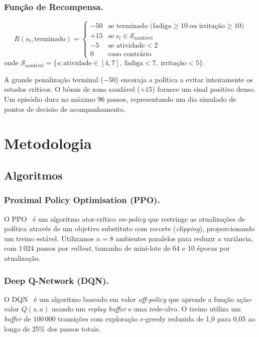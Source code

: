 \documentclass[runningheads]{llncs}
\begin{document}
\subsubsection{Função de Recompensa.}
\begin{equation}
  R(s_t, \text{terminado}) =
  \begin{cases}
    -50 & \text{se terminado (fadiga} \ge 10\ \text{ou irritação} \ge 10\text{)} \\
    +15 & \text{se}\ s_t \in \mathcal{S}_{\text{saudável}} \\
    -5  & \text{se atividade} < 2 \\
    0   & \text{caso contrário}
  \end{cases}
\end{equation}
onde $\mathcal{S}_{\text{saudável}} = \{s : \text{atividade} \in [4,7],\
\text{fadiga} < 7,\ \text{irritação} < 5\}$.

A grande penalização terminal ($-50$) encoraja a política a evitar inteiramente os
estados críticos. O bónus de zona saudável ($+15$) fornece um sinal positivo denso.
Um episódio dura no máximo 96 passos, representando um dia simulado de pontos de
decisão de acompanhamento.

%
\section{Metodologia}
\label{sec:method}

\subsection{Algoritmos}

\subsubsection{Proximal Policy Optimisation (PPO).}
O PPO~\cite{schulman2017} é um algoritmo ator-crítico \emph{on-policy} que
restringe as atualizações de política através de um objetivo substituto com
recorte (\emph{clipping}), proporcionando um treino estável. Utilizamos $n=8$
ambientes paralelos para reduzir a variância, com 1\,024 passos por \emph{rollout},
tamanho de mini-lote de 64 e 10 épocas por atualização.

\subsubsection{Deep Q-Network (DQN).}
O DQN~\cite{mnih2015} é um algoritmo baseado em valor \emph{off-policy} que aprende
a função ação-valor $Q(s,a)$ usando um \emph{replay buffer} e uma rede-alvo. O
treino utiliza um \emph{buffer} de 100\,000 transições com exploração
$\epsilon$-greedy reduzida de 1,0 para 0,05 ao longo de 25\% dos passos totais.
\end{document}
